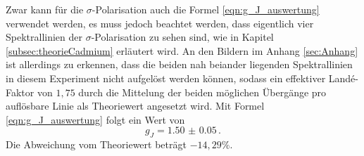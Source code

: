 Zwar kann für die $\sigma$-Polarisation auch die Formel \eqref{eqn:g_J_auswertung} verwendet werden, es muss jedoch beachtet werden, dass eigentlich vier Spektrallinien der $\sigma$-Polarisation zu sehen sind, wie in Kapitel \ref{subsec:theorieCadmium} erläutert wird. An den Bildern im Anhang \ref{sec:Anhang} ist allerdings zu erkennen, dass die beiden nah beiander liegenden Spektrallinien in diesem Experiment nicht aufgelöst werden können, sodass ein effektiver Landé-Faktor von $1{,}75$ durch die Mittelung der beiden möglichen Übergänge pro auflösbare Linie als Theoriewert angesetzt wird.
Mit Formel \eqref{eqn:g_J_auswertung} folgt ein Wert von
\begin{equation}
  g_J = \num{1.50(5)}\,.
\end{equation}
Die Abweichung vom Theoriewert beträgt $-14{,}29\%$.
